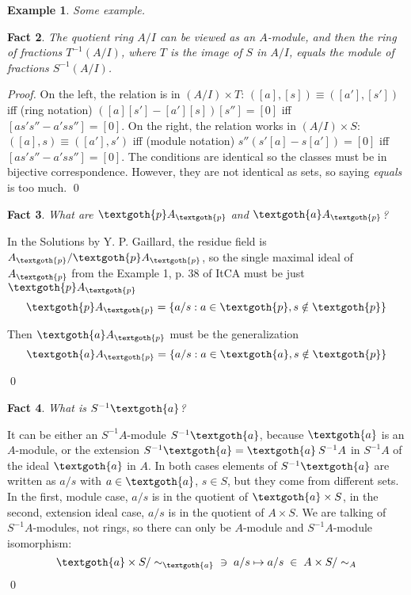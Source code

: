 \documentclass{article}
\newtheorem{theorem}{Fact}[section]
\newtheorem{example}[theorem]{Example}
\begin{document}
\bigskip
\begin{example}
Some example.
\end{example}

\vspace{.2em}
\begin{theorem}
The quotient ring $A/I$ can be viewed as an $A$-module, and then the ring of fractions $T^{-1}(A/I)$, where $T$ is the image of $S$ in $A/I$, equals the module of fractions $S^{-1}(A/I)$.
\end{theorem} 

\noindent
\textit{Proof.} On the left, the relation is in $ (A/I) \times T $: $ ([a], [s]) \equiv ([a'], [s']) $ iff (ring notation) $([a][s'] - [a'][s]) [s''] = [0]$ iff $[as's'' - a'ss''] = [0]$. On the right, the relation works in $ (A/I) \times S $: $ ([a], s) \equiv ([a'], s') $ iff (module notation) $s'' (s'[a] - s[a']) = [0]$ iff $[as's'' - a'ss''] = [0]$. The conditions are identical so the classes must be in bijective correspondence. However, they are not identical as sets, so saying \textit{equals} is too much.
\qed

\bigskip
\begin{theorem}
What are $\textgoth{p}A_\textgoth{p}$ and $\textgoth{a}A_\textgoth{p}$?
\end{theorem}

\noindent
In the Solutions by Y. P. Gaillard, the residue field is $A_\textgoth{p} / \textgoth{p}A_\textgoth{p}$, so the single maximal ideal of $A_\textgoth{p}$ from the Example 1, p. 38 of ItCA must be just $\textgoth{p}A_\textgoth{p}$
\[
  \textgoth{p}A_\textgoth{p} = \{a/s: a \in \textgoth{p}, s \notin \textgoth{p}\}
\]

\noindent
Then $\textgoth{a}A_\textgoth{p}$ must be the generalization
\[
  \textgoth{a}A_\textgoth{p} = \{a/s: a \in \textgoth{a}, s \notin \textgoth{p}\}
\]

\qed

\bigskip
\begin{theorem}
What is $S^{-1}\textgoth{a}$?
\end{theorem}

\noindent
It can be either an $S^{-1}A$-module $S^{-1}\textgoth{a}$, because $\textgoth{a}$ is an $A$-module, or the extension $S^{-1}\textgoth{a} = \textgoth{a} \: S^{-1}A$ in $S^{-1}A$ of the ideal $\textgoth{a}$ in $A$. In both cases elements of $S^{-1}\textgoth{a}$ are written as $a/s$ with $a \in \textgoth{a}$, $s \in S$, but they come from different sets. In the first, module case, $a/s$ is in the quotient of $\textgoth{a} \times S$, in the second, extension ideal case, $a/s$ is in the quotient of $A \times S$. We are talking of $S^{-1}A$-modules, not rings, so there can only be $A$-module and $S^{-1}A$-module isomorphism:
\[
  \textgoth{a} \times S / \sim_\textgoth{a} \; \; \ni \; a/s \mapsto a/s \; \in \; A \times S / \sim_A
\]
\qed
\end{document}
